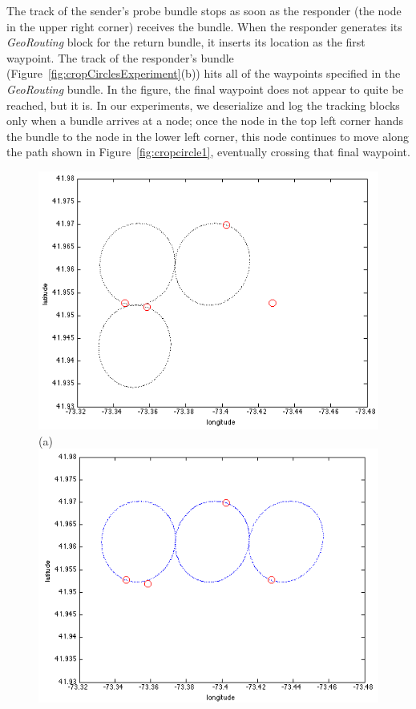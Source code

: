 The track of the sender's probe bundle stops as soon as the responder
(the node in the upper right corner) receives the bundle. When the
responder generates its {\em GeoRouting} block for the return bundle,
it inserts its location as the first waypoint. The track of the
responder's bundle (Figure~\ref{fig:cropCirclesExperiment}(b)) hits
all of the waypoints specified in the {\em GeoRouting} bundle. In the
figure, the final waypoint does not appear to quite be reached, but it
is. In our experiments, we deserialize and log the tracking blocks
only when a bundle arrives at a node; once the node in the top left
corner hands the bundle to the node in the lower left corner, this
node continues to move along the path shown in
Figure~\ref{fig:cropcircle1}, eventually crossing that final waypoint.
\begin{figure}
\begin{center}
\includegraphics[width=\columnwidth]{figures/cropCirclesExperiment2.png}\\
\vspace{-.25cm}
(a)
\includegraphics[width=\columnwidth]{figures/cropCirclesExperiment.png}\\

\end{center}
\end{figure}
